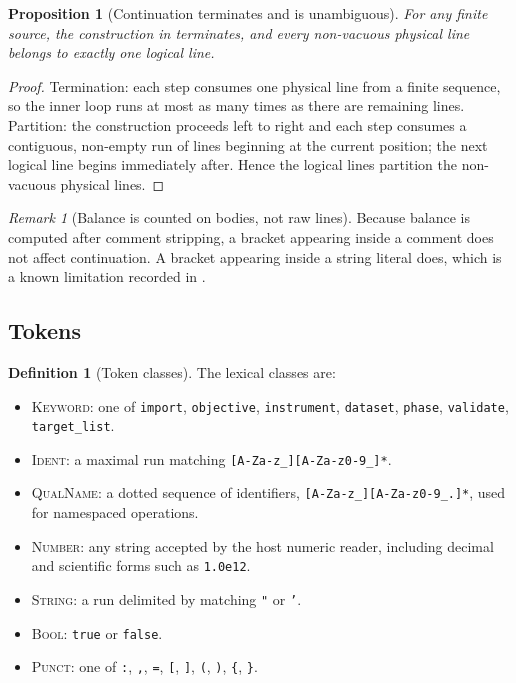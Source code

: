 \documentclass[11pt,twocolumn,a4paper]{article}
\theoremstyle{ssthm}
\newtheorem{proposition}[theorem]{Proposition}
\theoremstyle{definition}
\newtheorem{definition}[theorem]{Definition}
\theoremstyle{remark}
\newtheorem{remark}[theorem]{Remark}
\newcommand{\shk}[1]{\texttt{#1}}
\begin{document}
\begin{proposition}[Continuation terminates and is unambiguous]
\label{prop:continuation}
For any finite source, the construction in  terminates,
and every non-vacuous physical line belongs to exactly one logical line.
\end{proposition}

\begin{proof}
Termination: each step consumes one physical line from a finite
sequence, so the inner loop runs at most as many times as there are
remaining lines. Partition: the construction proceeds left to right and
each step consumes a contiguous, non-empty run of lines beginning at the
current position; the next logical line begins immediately after. Hence
the logical lines partition the non-vacuous physical lines.
\end{proof}

\begin{remark}[Balance is counted on bodies, not raw lines]
\label{rem:balance-body}
Because balance is computed after comment stripping, a bracket appearing
inside a comment does not affect continuation. A bracket appearing inside
a string literal does, which is a known limitation recorded in
.
\end{remark}

\subsection{Tokens}

\begin{definition}[Token classes]
\label{def:tokens}
The lexical classes are:
\begin{itemize}[leftmargin=1.6em,itemsep=1pt]
\item \textsc{Keyword}: one of \shk{import}, \shk{objective},
      \shk{instrument}, \shk{dataset}, \shk{phase}, \shk{validate},
      \shk{target\_list}.
\item \textsc{Ident}: a maximal run matching \shk{[A-Za-z\_][A-Za-z0-9\_]*}.
\item \textsc{QualName}: a dotted sequence of identifiers,
      \shk{[A-Za-z\_][A-Za-z0-9\_.]*}, used for namespaced operations.
\item \textsc{Number}: any string accepted by the host numeric reader,
      including decimal and scientific forms such as \shk{1.0e12}.
\item \textsc{String}: a run delimited by matching \shk{"} or \shk{'}.
\item \textsc{Bool}: \shk{true} or \shk{false}.
\item \textsc{Punct}: one of \shk{:}, \shk{,}, \shk{=},
      \shk{[}, \shk{]}, \shk{(}, \shk{)}, \shk{\{}, \shk{\}}.
\end{itemize}
\end{definition}
\end{document}
